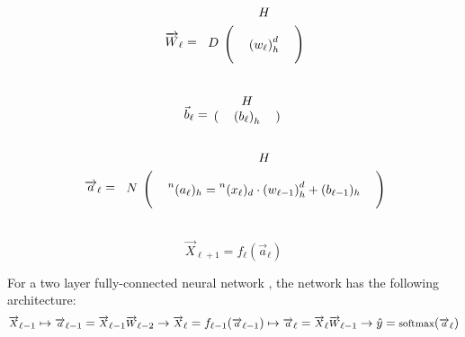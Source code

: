 \documentclass[12pt,a4paper]{article}%
\theoremstyle{definition}
\theoremstyle{plain}
\numberwithin{equation}{section}
\newcounter{subsubsubsection}[subsubsection]
\begin{document}
\begin{equation*}
\overrightarrow{W}_{\ell} =  \begin{blockarray}{cccc}
                                     & \multicolumn{3}{c}{$H$}  \\
\begin{block}{c(ccc)}
\multirow{3}{*}{$D$} &    &       &    \\
  					                 &      &  {(w_{\ell})}^{d}_{h}     &     \\
			     	                 &      &       &       \\
\end{block}
\end{blockarray}
\end{equation*}

\begin{equation*}
\vec{b}_{\ell} =  \begin{blockarray}{ccc}
    \multicolumn{3}{c}{$H$}  \\
\begin{block}{(ccc)}
    &    {(b_{\ell})}_{h}     &    \\
\end{block}
\end{blockarray}
\end{equation*}

\begin{equation*}
\overrightarrow{a}_{\ell} =  \begin{blockarray}{cccc}
                                     & \multicolumn{3}{c}{$H$}  \\
\begin{block}{c(ccc)}
\multirow{3}{*}{$N$} &    &       &    \\
  					                 &      & \prescript{n}{}{(a_{\ell})}_{h} =  \prescript{n}{}{(x_{\ell})}_{d} \cdot {(w_{\ell-1})}^{d}_{h}  + (b_{\ell-1})_{h}    &     \\
			     	                 &      &       &       \\
\end{block}
\end{blockarray}
\end{equation*}

\begin{equation}
\overrightarrow{X}_{\ell+1} = f_{\ell}(\overrightarrow{a}_{\ell} )
\end{equation}


For a two layer fully-connected neural network ,  the network has the following architecture: 
\begin{equation}
\footnotesize
\overrightarrow{X}_{\ell-1} \mapsto \overrightarrow{a}_{\ell-1} = \overrightarrow{X}_{\ell-1} \overrightarrow{W}_{\ell-2} \rightarrow 
\overrightarrow{X}_{\ell} = f_{\ell-1}(\overrightarrow{a}_{\ell-1}) \mapsto \overrightarrow{a}_{\ell} = \overrightarrow{X}_{\ell} \overrightarrow{W}_{\ell-1} \rightarrow \hat{y} = \text{softmax}(\overrightarrow{a}_{\ell})
\end{equation}
\end{document}
